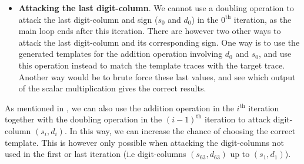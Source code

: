 \begin{itemize}
	\item \textbf{Attacking the last digit-column}. We cannot use a doubling operation to attack the last digit-column and sign ($s_{0}$ and $d_0$) in the $0^\mathrm{th}$ iteration, as the main loop ends after this iteration. 
	There are however two other ways to attack the last digit-column and its corresponding sign. 
	One way is to use the generated templates for the addition operation involving $d_0$ and $s_0$, and use this operation instead to match the template traces with the target trace.
	Another way would be to brute force these last values, and see which output of the scalar multiplication gives the correct results.
\end{itemize}
%
As mentioned in \cite{batina2014online}, we can also use the addition operation in the $i^\mathrm{th}$ iteration together with the doubling operation in the $(i - 1)^\mathrm{th}$ iteration to attack digit-column $(s_i, d_i)$.
In this way, we can increase the chance of choosing the correct template.
This is however only possible when attacking the digit-columns not used in the first or last iteration (i.e digit-columns $(s_{63}, d_{63})$ up to $(s_{1}, d_{1})$).